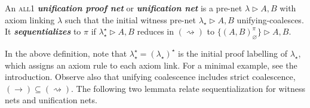 \documentclass[UKenglish]{lipics-v2019}
\makeatletter
\newcommand\defn[1]{\textit{\textbf{#1}}}
\newcommand\all{\textsc{all}}
\newcommand\+{+}
\renewcommand\*{\times}
\newcommand\seq[2]{{\vdash}#1,#2}
\newcommand\Seq{\vphantom(\seq}
\newcommand\Prf[3]{\deduce{\Seq{#2}{#3}}{\vphantom(#1}}
\newcommand\net[3]{#1\triangleright #2,#3}
\newcommand\coh{\smallfrown}
\newcommand\join{\vee}
\newcommand\link[3][\sigma]{(#2,#3)_{#1}}
\newcommand\scoal{\rightarrow} %
\newcommand\ucoal{\rightsquigarrow}
\newcommand\srr[1]{
  \ifx#1+\expandafter\@srr\else
  \ifx#1*\*\mathrm S\else
  \ifx#1!\forall\mathrm S\else
  \ifx#1?\exists\mathrm S\else 
  \ifx#11\mathrm{axS}\else
  #1\mathrm S  \fi\fi\fi\fi\fi
}
\newcommand\@srr[1]{+\mathrm S,{#1}}
\newcommand\urr[1]{
  \ifx#1+\expandafter\@urr\else
  \ifx#1*\*\mathrm U\else
  \ifx#1!\forall\mathrm U\else
  \ifx#1?\exists\mathrm U\else 
  \ifx#11\mathrm{axU}\else
  #1\mathrm U
  \fi\fi\fi\fi\fi
}
\newcommand\@urr[1]{+\mathrm U,{#1}}
\makeatother
\begin{document}

\begin{definition}
An \all1 \defn{unification proof net} or \defn{unification net} is a pre-net $\net\lambda AB$ with axiom linking $\lambda$ such that the initial witness pre-net $\net{\lambda_\star}AB$ unifying-coalesces. It \defn{sequentializes} to $\pi$ if $\net{\lambda^\star_\star}AB$ reduces in $(\ucoal)$ to $\net{\{\link[\varnothing]AB^\pi\}}AB$.
\end{definition}

In the above definition, note that $\lambda_\star^\star=(\lambda_\star)^\star$ is the initial proof labelling of $\lambda_\star$, which assigns an axiom rule to each axiom link. For a minimal example, see the introduction. Observe also that unifying coalescence includes strict coalescence, $(\scoal)\subseteq(\ucoal)$. The following two lemmata relate sequentialization for witness nets and unification nets.
\end{document}
